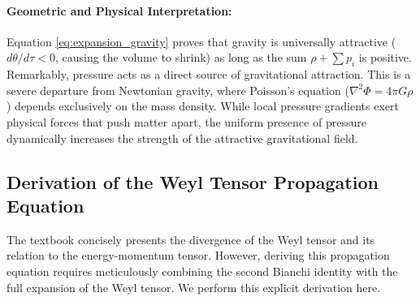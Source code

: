 \documentclass[11pt, a4paper]{report}
\begin{document}
\paragraph{Geometric and Physical Interpretation:} 
Equation \eqref{eq:expansion_gravity} proves that gravity is universally attractive ($d\theta/d\tau < 0$, causing the volume to shrink) as long as the sum $\rho + \sum p_{i}$ is positive. Remarkably, pressure acts as a direct source of gravitational attraction. This is a severe departure from Newtonian gravity, where Poisson's equation ($\nabla^{2}\Phi = 4\pi G\rho$) depends exclusively on the mass density. While local pressure gradients exert physical forces that push matter apart, the uniform presence of pressure dynamically increases the strength of the attractive gravitational field. 
\subsection{Derivation of the Weyl Tensor Propagation Equation}

The textbook concisely presents the divergence of the Weyl tensor and its relation to the energy-momentum tensor. However, deriving this propagation equation requires meticulously combining the second Bianchi identity with the full expansion of the Weyl tensor. We perform this explicit derivation here.
\end{document}
